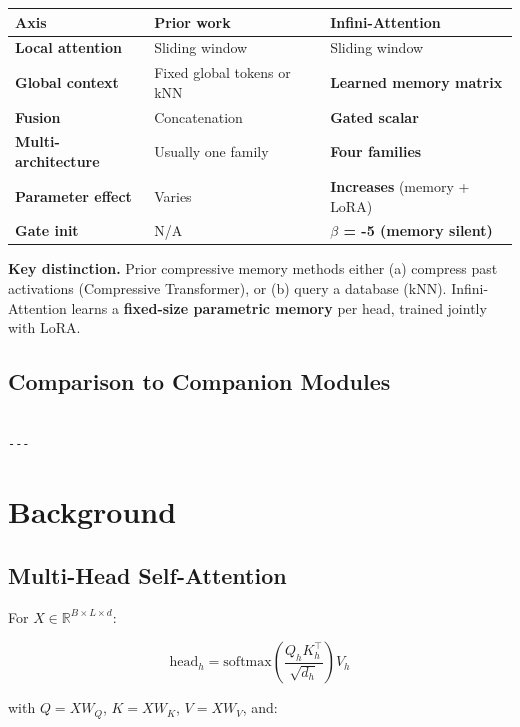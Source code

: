 \begin{table}[H]
\centering
\small
\begin{tabular}{lll}
\toprule
\textbf{Axis} & \textbf{Prior work} & \textbf{Infini-Attention} \\
\midrule
\textbf{Local attention} & Sliding window & Sliding window \\
\textbf{Global context} & Fixed global tokens or kNN & \textbf{Learned memory matrix} \\
\textbf{Fusion} & Concatenation & \textbf{Gated scalar} \\
\textbf{Multi-architecture} & Usually one family & \textbf{Four families} \\
\textbf{Parameter effect} & Varies & \textbf{Increases} (memory + LoRA) \\
\textbf{Gate init} & N/A & \textbf{$\beta$ = -5 (memory silent)} \\
\bottomrule
\end{tabular}
\end{table}

\textbf{Key distinction.} Prior compressive memory methods either (a) compress 
past activations (Compressive Transformer), or (b) query a database (kNN). 
Infini-Attention learns a \textbf{fixed-size parametric memory} per head, 
trained jointly with LoRA.

\subsection{Comparison to Companion Modules}

\begin{lstlisting}

---
\end{lstlisting}


\section{Background}

\subsection{Multi-Head Self-Attention}

For $X \in \mathbb{R}^{B \times L \times d}$:

\[
\text{head}_h = \text{softmax}\!\left(\frac{Q_h K_h^\top}{\sqrt{d_h}}\right) V_h
\tag{3.1}
\]

with $Q = X W_Q$, $K = X W_K$, $V = X W_V$, and:

